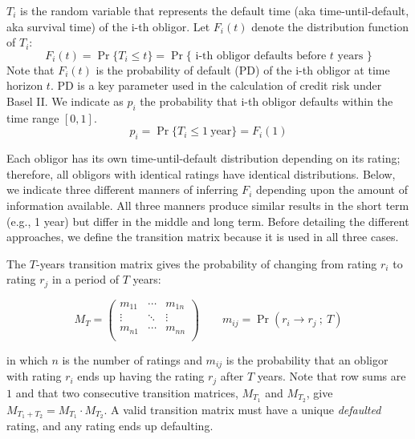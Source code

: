 \documentclass[11pt,fleqn]{book} %
\begin{document}
\begin{definition}
	$T_i$ is the random variable that represents the default time 
	(aka time-until-default, aka survival time) of the i-th obligor. 
	Let $F_i(t)$ denote the distribution function of $T_i$:
	\begin{displaymath}
		F_i(t) = \Pr\{T_i \le t\} = 
		\Pr\{\text{ i-th obligor defaults before $t$ years }\}
	\end{displaymath}
	Note that $F_i(t)$ is the probability of default (PD) of the i-th obligor
	at time horizon $t$. PD is a key parameter used in the calculation of credit 
	risk under Basel II\@. We indicate as $p_i$ the probability that i-th obligor 
	defaults within the time range $[0,1]$.
	\begin{displaymath}
		p_i = \Pr\{T_i \le 1\ \text{year}\} = F_i(1) 
	\end{displaymath}
\end{definition}

Each obligor has its own time-until-default distribution depending on its 
rating; therefore, all obligors with identical ratings have identical
distributions. Below, we indicate three different manners of inferring $F_i$ 
depending upon the amount of information available. All three manners produce 
similar results in the short term (e.g., 1 year) but differ in the middle and
long term. Before detailing the different approaches, we define the transition 
matrix because it is used in all three cases.

\begin{definition}
	\label{def:tm}
	The $T$-years transition matrix gives the probability of changing 
	from rating $r_i$ to rating $r_j$ in a period of $T$ years:
	{\small
	\begin{displaymath}
		M_T = \left(
		\begin{array}{ccc}
			m_{11} & \cdots & m_{1n} \\
			\vdots & \ddots & \vdots \\
			m_{n1} & \cdots & m_{nn} \\
		\end{array}
		\right)
		\qquad
		m_{ij} = \Pr(r_i \to r_j\ ;\ T)
	\end{displaymath}\par}
	in which $n$ is the number of ratings and $m_{ij}$ is the probability that 
	an obligor with rating $r_i$ ends up having the rating $r_j$ after $T$ years.
	Note that row sums are $1$ and that two consecutive transition matrices, 
	$M_{T_1}$ and $M_{T_2}$, give $M_{T_1+T_2} = M_{T_1} \cdot M_{T_2}$.
	A valid transition matrix must have a unique \emph{defaulted} rating, and 
	any rating ends up defaulting.
\end{definition}
\end{document}
